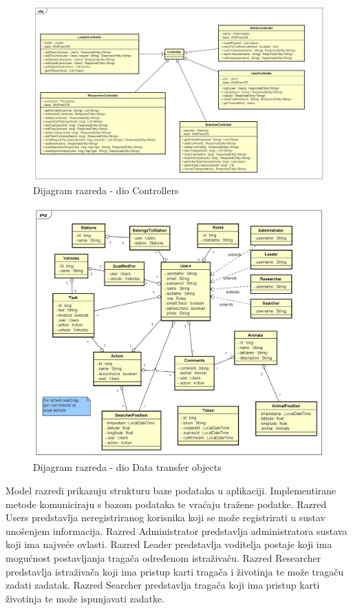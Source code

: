 			\begin{figure}[H]
				\includegraphics[scale=0.4]{slike/klasni_dijagram_controllers.jpg}
				\centering
				\caption{Dijagram razreda - dio Controllers}
				\label{fig:controllers}
			\end{figure}
			
			\eject

			\begin{figure}[H]
				\includegraphics[scale=0.5]{slike/klasni_dijagram_data_transfer_objects.jpg}
				\centering
				\caption{Dijagram razreda - dio Data transfer objects}
				\label{fig:data_transfer_objects}
			\end{figure}

			Model razredi prikazuju strukturu baze podataka u aplikaciji. 
			Implementirane metode komuniciraju s bazom podataka te vraćaju tražene podatke. 
			Razred Users predstavlja neregistriranog korisnika koji se može registrirati u 
			sustav unošenjem informacija. Razred Administrator predstavlja administratora 
			sustava koji ima najveće ovlasti. Razred Leader predstavlja voditelja postaje koji ima mogućnost postavljanja tragača određenom istraživaču.
			Razred Researcher predstavlja istraživača koji ima pristup karti tragača i životinja te može tragaču zadati zadatak. 
			Razred Searcher predstavlja tragača koji ima pristup karti životinja te može ispunjavati zadatke.


